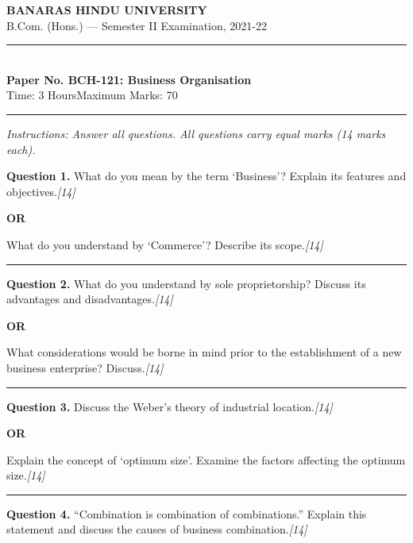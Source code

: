 \documentclass[11pt,a4paper]{article}
\newcommand{\pts}[1]{\hfill   \textit{[#1]}}
\begin{document}
\begin{center}
  {\large\bfseries BANARAS HINDU UNIVERSITY}\\[2pt]
  {\normalsize B.Com. (Hons.) --- Semester II Examination, 2021-22}\\[6pt]
  \rule{0.8\linewidth}{0.5pt}\\[6pt]
  {\large\bfseries Paper No. BCH-121: Business Organisation}\\[4pt]
  {\normalsize Time: 3 Hours\hfill Maximum Marks: 70}
\end{center}

\rule{\linewidth}{0.4pt}

\smallskip



\noindent   \textit{Instructions: Answer all questions. All questions carry equal marks (14 marks each).}

\bigskip




\noindent   \textbf{Question 1.}
What do you mean by the term `Business'? Explain its features and objectives.\pts{14}

\centerline{   \textbf{OR}}

What do you understand by `Commerce'? Describe its scope.\pts{14}

\medskip\rule{\linewidth}{0.2pt}




\noindent   \textbf{Question 2.}
What do you understand by sole proprietorship? Discuss its advantages and disadvantages.\pts{14}

\centerline{   \textbf{OR}}

What considerations would be borne in mind prior to the establishment of a new business enterprise? Discuss.\pts{14}

\medskip\rule{\linewidth}{0.2pt}




\noindent   \textbf{Question 3.}
Discuss the Weber's theory of industrial location.\pts{14}

\centerline{   \textbf{OR}}

Explain the concept of `optimum size'. Examine the factors affecting the optimum size.\pts{14}

\medskip\rule{\linewidth}{0.2pt}




\noindent   \textbf{Question 4.}
``Combination is combination of combinations.'' Explain this statement and discuss the causes of business combination.\pts{14}
\end{document}
